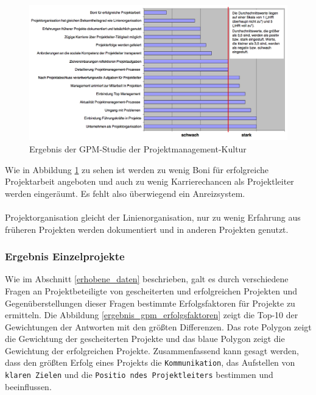 \documentclass[12pt]{scrartcl}
\begin{document}
\begin{figure}[H]
	\begin{center}
		\includegraphics[width=1.0\textwidth]{img/ergebnis_gpm_studie_kultur}
		\caption{Ergebnis der GPM-Studie der Projektmanagement-Kultur}
		\label{erfgebnis_gpm_studie_pmk}	
	\end{center}
\end{figure}

Wie in Abbildung \ref{erfgebnis_gpm_studie_pmk} zu sehen ist werden zu wenig Boni für erfolgreiche Projektarbeit angeboten und auch zu wenig Karrierechancen als Projektleiter werden eingeräumt. Es fehlt also überwiegend ein Anreizsystem.\\
\\ 
Projektorganisation gleicht der Linienorganisation, nur zu wenig Erfahrung aus früheren Projekten werden dokumentiert und in anderen Projekten genutzt.

\subsubsection{Ergebnis Einzelprojekte}

Wie im Abschnitt \ref{erhobene_daten} beschrieben, galt es durch verschiedene Fragen an Projektbeteiligte von gescheiterten und erfolgreichen Projekten und Gegenüberstellungen dieser Fragen bestimmte Erfolgsfaktoren für Projekte zu ermitteln. Die Abbildung \ref{ergebnis_gpm_erfolgsfaktoren} zeigt die Top-10 der Gewichtungen der Antworten mit den größten Differenzen. Das rote Polygon zeigt die Gewichtung der gescheiterten Projekte und das blaue Polygon zeigt die Gewichtung der erfolgreichen Projekte. Zusammenfassend kann gesagt werden, dass den größten Erfolg eines Projekts die \texttt{Kommunikation}, das Aufstellen von \texttt{klaren Zielen} und die \texttt{Positio ndes Projektleiters} bestimmen und beeinflussen.
\end{document}
